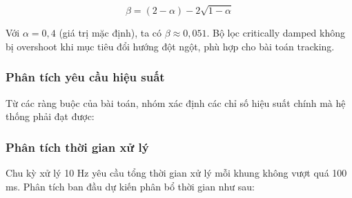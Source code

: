 \begin{equation}
\beta = (2 - \alpha) - 2\sqrt{1 - \alpha}
\end{equation}

Với $\alpha = 0{,}4$ (giá trị mặc định), ta có $\beta \approx 0{,}051$. Bộ lọc critically damped không bị overshoot khi mục tiêu đổi hướng đột ngột, phù hợp cho bài toán tracking.

\subsubsection{Phân tích yêu cầu hiệu suất}

\hspace{0.5cm} Từ các ràng buộc của bài toán, nhóm xác định các chỉ số hiệu suất chính mà hệ thống phải đạt được:

\begin{table}[H]
\centering
\caption{Các chỉ số hiệu suất thiết kế của hệ thống}
\label{tab:performance-spec}
\end{table}

\subsubsection{Phân tích thời gian xử lý}

\hspace{0.5cm} Chu kỳ xử lý 10 Hz yêu cầu tổng thời gian xử lý mỗi khung không vượt quá 100 ms. Phân tích ban đầu dự kiến phân bổ thời gian như sau:

